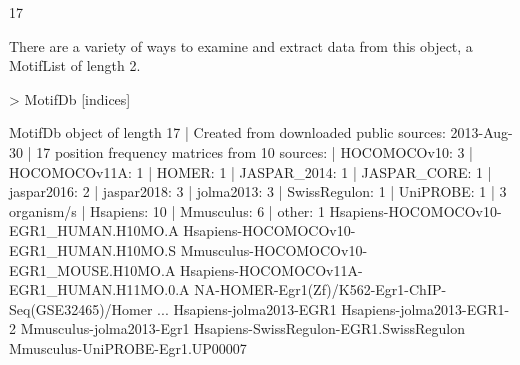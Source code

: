 \documentclass{article}
\renewenvironment{Schunk}{\vspace{\topsep}}{\vspace{\topsep}}
\begin{document}
\begin{Schunk}
\begin{Soutput}
[1] 17
\end{Soutput}
\end{Schunk}
There are a variety of ways to examine and extract data from this object, a MotifList of length 2.
\begin{Schunk}
\begin{Sinput}
> MotifDb [indices]
\end{Sinput}
\begin{Soutput}
MotifDb object of length 17
| Created from downloaded public sources: 2013-Aug-30
| 17 position frequency matrices from 10 sources:
|        HOCOMOCOv10:    3
|       HOCOMOCOv11A:    1
|              HOMER:    1
|        JASPAR_2014:    1
|        JASPAR_CORE:    1
|         jaspar2016:    2
|         jaspar2018:    3
|          jolma2013:    3
|       SwissRegulon:    1
|           UniPROBE:    1
| 3 organism/s
|           Hsapiens:   10
|          Mmusculus:    6
|              other:    1
Hsapiens-HOCOMOCOv10-EGR1_HUMAN.H10MO.A 
Hsapiens-HOCOMOCOv10-EGR1_HUMAN.H10MO.S 
Mmusculus-HOCOMOCOv10-EGR1_MOUSE.H10MO.A 
Hsapiens-HOCOMOCOv11A-EGR1_HUMAN.H11MO.0.A 
NA-HOMER-Egr1(Zf)/K562-Egr1-ChIP-Seq(GSE32465)/Homer 
...
Hsapiens-jolma2013-EGR1 
Hsapiens-jolma2013-EGR1-2 
Mmusculus-jolma2013-Egr1 
Hsapiens-SwissRegulon-EGR1.SwissRegulon 
Mmusculus-UniPROBE-Egr1.UP00007 
\end{Soutput}
\end{Schunk}
\end{document}
